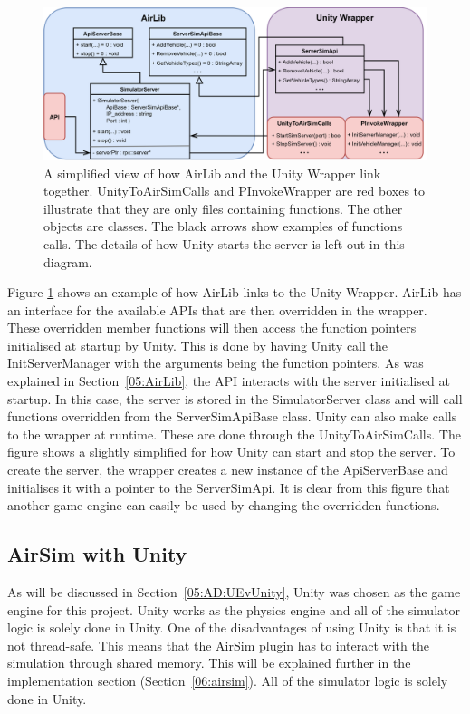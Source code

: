 \begin{figure}[h]
    \centering
    \includegraphics[width=1\textwidth]{05_AnalysisAndDesign/Diagrams/UnityWrapper2.png}
    \caption[AirLib and AirLib Wrapper]{A simplified view of how AirLib and the Unity Wrapper link together. UnityToAirSimCalls and PInvokeWrapper are red boxes to illustrate that they are only files containing functions. The other objects are classes. The black arrows show examples of functions calls. The details of how Unity starts the server is left out in this diagram.} \label{05:fig:UnityWrapper}
\end{figure}

Figure \ref{05:fig:UnityWrapper} shows an example of how AirLib links to the Unity Wrapper. AirLib has an interface for the available APIs that are then overridden in the wrapper. These overridden member functions will then access the function pointers initialised at startup by Unity. This is done by having Unity call the InitServerManager with the arguments being the function pointers. As was explained in Section~\ref{05:AirLib}, the API interacts with the server initialised at startup. In this case, the server is stored in the SimulatorServer class and will call functions overridden from the ServerSimApiBase class. Unity can also make calls to the wrapper at runtime. These are done through the UnityToAirSimCalls. The figure shows a slightly simplified for how Unity can start and stop the server. To create the server, the wrapper creates a new instance of the ApiServerBase and initialises it with a pointer to the ServerSimApi. It is clear from this figure that another game engine can easily be used by changing the overridden functions. 


\subsection{AirSim with Unity}
As will be discussed in Section~\ref{05:AD:UEvUnity}, Unity was chosen as the game engine for this project. Unity works as the physics engine and all of the simulator logic is solely done in Unity. One of the disadvantages of using Unity is that it is not thread-safe. This means that the AirSim plugin has to interact with the simulation through shared memory. This will be explained further in the implementation section (Section~\ref{06:airsim}). All of the simulator logic is solely done in Unity.

